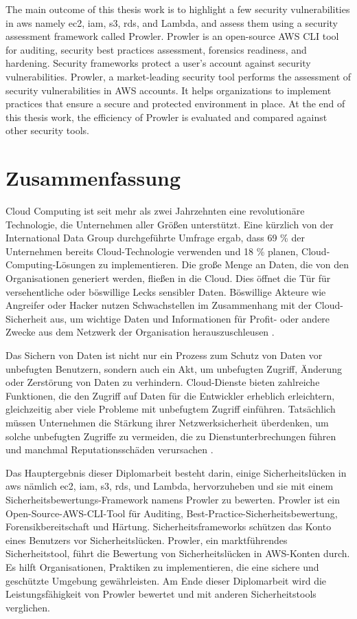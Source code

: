 \documentclass[a4paper,11pt]{report}
\begin{document}
\hfill \break
The main outcome of this thesis work is to highlight a
few security vulnerabilities in \gls{aws} namely
\gls{ec2}, \gls{iam},
\gls{s3}, \gls{rds}, and Lambda, and assess them using a
security assessment framework called Prowler.
Prowler is an open-source AWS CLI tool for auditing, security best practices assessment, forensics readiness, and hardening.
Security frameworks protect a user’s account against security vulnerabilities.
Prowler, a market-leading security tool performs the assessment of security vulnerabilities in AWS accounts.
It helps organizations to implement practices that ensure a secure and protected environment in place.
At the end of this thesis work, the efficiency of Prowler is evaluated and compared against other security tools.

\cleardoublepage


\section*{Zusammenfassung}
\text
Cloud Computing ist seit mehr als zwei Jahrzehnten eine revolutionäre Technologie, die Unternehmen aller Größen unterstützt.
Eine kürzlich von der International Data Group durchgeführte Umfrage ergab, dass 69 \% der Unternehmen bereits Cloud-Technologie verwenden und 18 \% planen, Cloud-Computing-Lösungen zu implementieren.
Die große Menge an Daten, die von den Organisationen generiert werden, fließen in die Cloud.
Dies öffnet die Tür für versehentliche oder böswillige Lecks sensibler Daten.
Böswillige Akteure wie Angreifer oder Hacker nutzen Schwachstellen im Zusammenhang mit der Cloud-Sicherheit aus, um wichtige Daten und Informationen für Profit- oder andere Zwecke aus dem Netzwerk der Organisation herauszuschleusen \cite{1}.


Das Sichern von Daten ist nicht nur ein Prozess zum Schutz von Daten vor unbefugten Benutzern, sondern auch ein Akt, um unbefugten Zugriff, Änderung oder Zerstörung von Daten zu verhindern.
Cloud-Dienste bieten zahlreiche Funktionen, die den Zugriff auf Daten für die Entwickler erheblich erleichtern, gleichzeitig aber viele Probleme mit unbefugtem Zugriff einführen.
Tatsächlich müssen Unternehmen die Stärkung ihrer Netzwerksicherheit überdenken, um solche unbefugten Zugriffe zu vermeiden, die zu Dienstunterbrechungen führen und manchmal Reputationsschäden verursachen \cite{1}.


Das Hauptergebnis dieser Diplomarbeit besteht darin, einige Sicherheitslücken in \gls{aws} nämlich
\gls{ec2}, \gls{iam},
\gls{s3}, \gls{rds}, und Lambda, hervorzuheben und sie mit einem Sicherheitsbewertungs-Framework namens Prowler zu bewerten.
Prowler ist ein Open-Source-AWS-CLI-Tool für Auditing, Best-Practice-Sicherheitsbewertung, Forensikbereitschaft und Härtung.
Sicherheitsframeworks schützen das Konto eines Benutzers vor Sicherheitslücken.
Prowler, ein marktführendes Sicherheitstool, führt die Bewertung von Sicherheitslücken in AWS-Konten durch.
Es hilft Organisationen, Praktiken zu implementieren, die eine sichere und geschützte Umgebung gewährleisten.
Am Ende dieser Diplomarbeit wird die Leistungsfähigkeit von Prowler bewertet und mit anderen Sicherheitstools verglichen.
\end{document}
